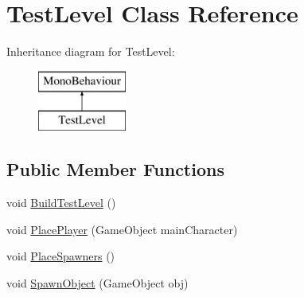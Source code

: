 \hypertarget{class_test_level}{}\section{Test\+Level Class Reference}
\label{class_test_level}
Inheritance diagram for Test\+Level\+:\begin{figure}[H]
\begin{center}
\leavevmode
\includegraphics[height=2.000000cm]{class_test_level}
\end{center}
\end{figure}
\subsection*{Public Member Functions}
\begin{DoxyCompactItemize}
\item 
void \mbox{\hyperlink{class_test_level_a6834e350643e7c5bf7ed27d2632f2c92}{Build\+Test\+Level}} ()
\item 
void \mbox{\hyperlink{class_test_level_a7d2ab938df8d29835dee0e7c0defb8e0}{Place\+Player}} (Game\+Object main\+Character)
\item 
void \mbox{\hyperlink{class_test_level_a364cafbd3aa2773d6bba94c313eb0b21}{Place\+Spawners}} ()
\item 
void \mbox{\hyperlink{class_test_level_aaad14a792f3c43f6fb9cb012b1dec89d}{Spawn\+Object}} (Game\+Object obj)
\end{DoxyCompactItemize}
